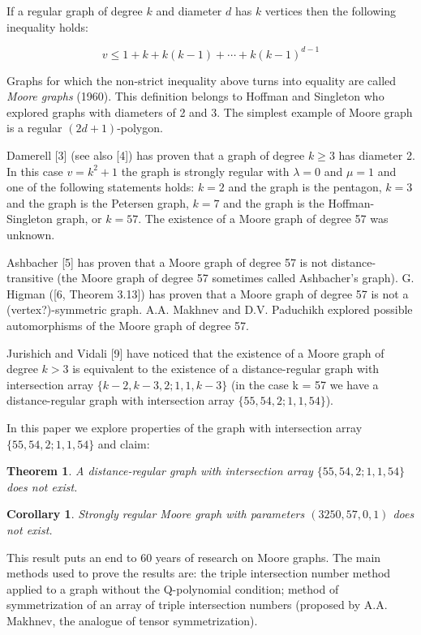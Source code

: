 \documentclass{article}
\newtheorem{theorem}{Theorem}
\newtheorem{corollary}{Corollary}
\theoremstyle{definition}
\theoremstyle{definition}
\theoremstyle{remark}
\begin{document}
If a regular graph of degree $k$ and diameter $d$ has $k$ vertices then the following inequality holds:

\[
    v \le 1 + k + k(k-1) + \cdots + k(k-1)^{d-1}
\]

Graphs for which the non-strict inequality above turns into equality are called {\it Moore graphs} (1960). This definition belongs to Hoffman and Singleton who explored graphs with diameters of 2 and 3. The simplest example of Moore graph is a regular  $(2d +1)$-polygon.

Damerell [3] (see also [4]) has proven that a graph of degree $k \ge 3$ has diameter 2. In this case $ v = k^2 + 1$ the graph is strongly regular with $\lambda = 0$ and $ \mu = 1 $ and one of the following statements holds: $k = 2$ and the graph is the pentagon, $k = 3$ and the graph is the Petersen graph, $k = 7$ and the graph is the Hoffman-Singleton graph, or $k = 57$. The existence of a Moore graph of degree 57 was unknown.

Ashbacher [5] has proven that a Moore graph of degree 57 is not distance-transitive (the Moore graph of degree 57 sometimes called Ashbacher's graph). G. Higman ([6, Theorem 3.13]) has proven that a Moore graph of degree 57 is not a (vertex?)-symmetric graph. A.A. Makhnev and D.V. Paduchikh explored possible automorphisms of the Moore graph of degree 57.

Jurishich and Vidali [9] have noticed that the existence of a Moore graph of degree $k > 3$ is equivalent to the existence of a distance-regular graph with intersection array $\{k - 2, k - 3, 2; 1, 1, k - 3\}$ (in the case k = 57 we have a distance-regular graph with intersection array $\{55, 54, 2; 1, 1, 54\}$).

In this paper we explore properties of the graph with intersection array $\{55, 54, 2; 1, 1, 54\}$ and claim:

\begin{theorem}A distance-regular graph with intersection array $\{55, 54, 2; 1, 1, 54\}$ does not exist.
\label{th:1}
\end{theorem}

\begin{corollary}Strongly regular Moore graph with parameters $(3250, 57, 0, 1)$ does not exist.
\end{corollary}

This result puts an end to 60 years of research on Moore graphs. The main methods used to prove the results are: the triple intersection number method applied to a graph without the Q-polynomial condition; method of symmetrization of an array of triple intersection numbers (proposed by A.A. Makhnev, the analogue of tensor symmetrization).
\end{document}
